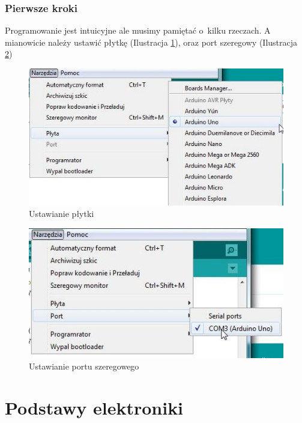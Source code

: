 \documentclass[a4paper,12pt, twoside]{article}
\let\oldsection\section		%
\renewcommand\section{\clearpage\oldsection}%
\begin{document}
\subsubsection{Pierwsze kroki}
Programowanie jest intuicyjne ale musimy pamiętać o~kilku rzeczach. A mianowicie należy ustawić płytkę (Ilustracja \ref{fig:plytka}), oraz port szeregowy (Ilustracja \ref{fig:port})%


\begin{figure}[h]  
  \includegraphics[scale=0.7]{arduino-ustawPlytke.jpg}
  \caption{Ustawianie płytki}
  \label{fig:plytka}
	\end{figure}
	\begin{figure}[h]
  \includegraphics[scale=0.7]{arduino-ustawPort.jpg}
  \caption{Ustawianie portu szeregowego}
  \label{fig:port}
\end{figure}



\cite{Introduction, Reference}



\section{Podstawy elektroniki}
\end{document}
